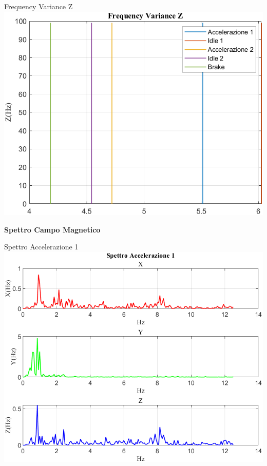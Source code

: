 \documentclass[beamer]{standalone}
\begin{document}
	\begin{frame}{{Frequency Variance Z}}
		\centering\includegraphics[height=.8\textheight]{figure/Mag/Trasformata/Frequency VarianceZ}
	\end{frame}
	
	\begin{frame}
		\color{blue}\centering\huge{\textbf{Spettro Campo Magnetico}}
	\end{frame}
	
	\begin{frame}{{Spettro Accelerazione 1}}
		\centering\includegraphics[height=.8\textheight]{figure/Mag/Trasformata/Spettro Accelerazione 1}
	\end{frame}
	
\end{document}

